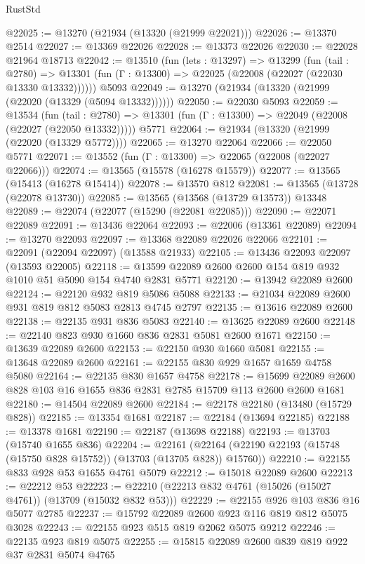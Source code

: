 \begin{lexlean}{RustStd}
\begin{coremodule}
@22025 := @13270 (@21934 (@13320 (@21999 @22021)))
@22026 := @13370 @2514
@22027 := @13369 @22026
@22028 := @13373 @22026
@22030 := @22028 @21964 @18713
@22042 := @13510
    (fun (lets : @13297) =>
    @13299
      (fun (tail : @2780) =>
      @13301 (fun (Γ : @13300) => @22025 (@22008 (@22027 (@22030 @13330 @13332))))))
    @5093
@22049 := @13270 (@21934 (@13320 (@21999 (@22020 (@13329 (@5094 @13332))))))
@22050 := @22030 @5093
@22059 := @13534
    (fun (tail : @2780) => @13301 (fun (Γ : @13300) => @22049 (@22008 (@22027 (@22050 @13332)))))
    @5771
@22064 := @21934 (@13320 (@21999 (@22020 (@13329 @5772))))
@22065 := @13270 @22064
@22066 := @22050 @5771
@22071 := @13552 (fun (Γ : @13300) => @22065 (@22008 (@22027 @22066)))
@22074 := @13565 (@15578 (@16278 @15579))
@22077 := @13565 (@15413 (@16278 @15414))
@22078 := @13570 @812
@22081 := @13565 (@13728 (@22078 @13730))
@22085 := @13565 (@13568 (@13729 @13573)) @13348
@22089 := @22074 (@22077 (@15290 (@22081 @22085)))
@22090 := @22071 @22089
@22091 := @13436 @22064
@22093 := @22006 (@13361 @22089)
@22094 := @13270 @22093
@22097 := @13368 @22089 @22026 @22066
@22101 := @22091 (@22094 @22097) (@13588 @21933)
@22105 := @13436 @22093 @22097 (@13593 @22005)
@22118 := @13599 @22089 @2600 @2600 @154 @819 @932 @1010 @51 @5090 @154 @4740 @2831 @5771
@22120 := @13942 @22089 @2600
@22124 := @22120 @932 @819 @5086 @5088
@22133 := @21034 @22089 @2600 @931 @819 @812 @5083 @2813 @4745 @2797
@22135 := @13616 @22089 @2600
@22138 := @22135 @931 @836 @5083
@22140 := @13625 @22089 @2600
@22148 := @22140 @823 @930 @1660 @836 @2831 @5081 @2600 @1671
@22150 := @13639 @22089 @2600
@22153 := @22150 @930 @1660 @5081
@22155 := @13648 @22089 @2600
@22161 := @22155 @830 @929 @1657 @1659 @4758 @5080
@22164 := @22135 @830 @1657 @4758
@22178 := @15699 @22089 @2600 @828 @103 @16 @1655 @836 @2831 @2785 @15709 @113 @2600 @2600 @1681
@22180 := @14504 @22089 @2600
@22184 := @22178 @22180 (@13480 (@15729 @828))
@22185 := @13354 @1681
@22187 := @22184 (@13694 @22185)
@22188 := @13378 @1681
@22190 := @22187 (@13698 @22188)
@22193 := @13703 (@15740 @1655 @836)
@22204 := @22161
    (@22164 (@22190 @22193 (@15748 (@15750 @828 @15752)) (@13703 (@13705 @828)) @15760))
@22210 := @22155 @833 @928 @53 @1655 @4761 @5079
@22212 := @15018 @22089 @2600
@22213 := @22212 @53
@22223 := @22210 (@22213 @832 @4761 (@15026 (@15027 @4761)) (@13709 (@15032 @832 @53)))
@22229 := @22155 @926 @103 @836 @16 @5077 @2785
@22237 := @15792 @22089 @2600 @923 @116 @819 @812 @5075 @3028
@22243 := @22155 @923 @515 @819 @2062 @5075 @9212
@22246 := @22135 @923 @819 @5075
@22255 := @15815 @22089 @2600 @839 @819 @922 @37 @2831 @5074 @4765

\end{coremodule}
\end{lexlean}
